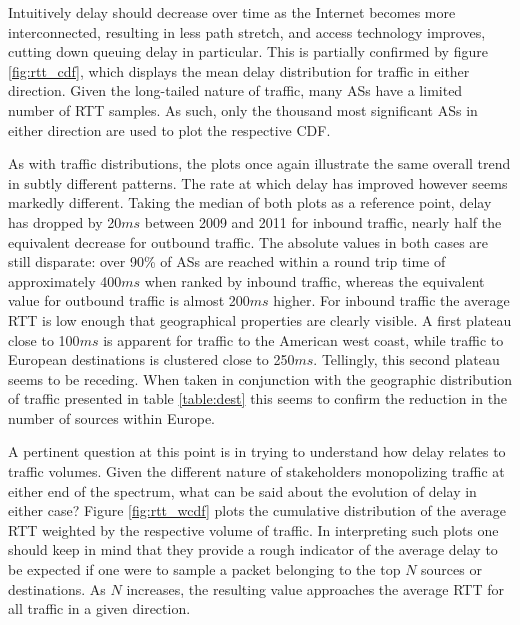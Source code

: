 Intuitively delay should decrease over time as the Internet becomes more interconnected, resulting in less path stretch, and access technology improves, cutting down queuing delay in particular.
This is partially confirmed by figure \ref{fig:rtt_cdf}, which displays the mean delay distribution for traffic in either direction.
Given the long-tailed nature of traffic, many \acp{AS} have a limited number of \ac{RTT} samples.
As such, only the thousand most significant \acp{AS} in either direction are used to plot the respective \acs{CDF}.

As with traffic distributions, the plots once again illustrate the same overall trend in subtly different patterns. 
The rate at which delay has improved however seems markedly different. 
Taking the median of both plots as a reference point, delay has dropped by 20$ms$ between 2009 and 2011 for inbound traffic, nearly half the equivalent decrease for outbound traffic.
The absolute values in both cases are still disparate: over 90\% of \acp{AS} are reached within a round trip time of approximately 400$ms$ when ranked by inbound traffic, whereas the equivalent value for outbound traffic is almost 200$ms$ higher. 
For inbound traffic the average \ac{RTT} is low enough that geographical properties are clearly visible. 
A first plateau close to 100$ms$ is apparent for traffic to the American west coast, while traffic to European destinations is clustered close to 250$ms$. 
Tellingly, this second plateau seems to be receding.
When taken in conjunction with the geographic distribution of traffic presented in table \ref{table:dest} this seems to confirm the reduction in the number of sources within Europe. 

A pertinent question at this point is in trying to understand how delay relates to traffic volumes. 
Given the different nature of stakeholders monopolizing traffic at either end of the spectrum, what can be said about the evolution of delay in either case? 
Figure \ref{fig:rtt_wcdf} plots the cumulative distribution of the average \ac{RTT} weighted by the respective volume of traffic.
In interpreting such plots one should keep in mind that they provide a rough indicator of the average delay to be expected if one were to sample a packet belonging to the top $N$ sources or destinations. 
As $N$ increases, the resulting value approaches the average RTT for all traffic in a given direction.


